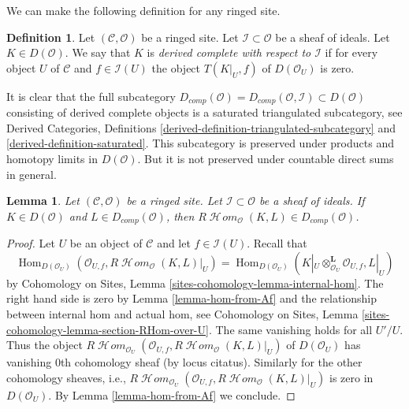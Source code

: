 \documentclass{stacks-project}
\theoremstyle{plain}
\newtheorem{lemma}[subsection]{Lemma}
\theoremstyle{definition}
\newtheorem{definition}[subsection]{Definition}
\theoremstyle{remark}
\numberwithin{equation}{subsection}
\def\Hom{\mathop{\mathrm{Hom}}\nolimits}
\def\SheafHom{\mathop{\mathcal{H}\!\mathit{om}}\nolimits}
\begin{document}
\noindent
We can make the following definition for any ringed site.

\begin{definition}
\label{definition-derived-complete}
Let $(\mathcal{C}, \mathcal{O})$ be a ringed site.
Let $\mathcal{I} \subset \mathcal{O}$ be a sheaf of ideals.
Let $K \in D(\mathcal{O})$. We say that $K$ is
{\it derived complete with respect to $\mathcal{I}$}
if for every object $U$ of $\mathcal{C}$ and $f \in \mathcal{I}(U)$
the object $T(K|_U, f)$ of $D(\mathcal{O}_U)$ is zero.
\end{definition}

\noindent
It is clear that the full subcategory
$D_{comp}(\mathcal{O}) = D_{comp}(\mathcal{O}, \mathcal{I}) \subset
D(\mathcal{O})$ consisting of derived complete objects
is a saturated triangulated subcategory, see
Derived Categories, Definitions
\ref{derived-definition-triangulated-subcategory} and
\ref{derived-definition-saturated}. This subcategory is preserved
under products and homotopy limits in $D(\mathcal{O})$.
But it is not preserved under countable direct sums in general.

\begin{lemma}
\label{lemma-derived-complete-internal-hom}
Let $(\mathcal{C}, \mathcal{O})$ be a ringed site.
Let $\mathcal{I} \subset \mathcal{O}$ be a sheaf of ideals.
If $K \in D(\mathcal{O})$ and $L \in D_{comp}(\mathcal{O})$, then
$R\SheafHom_\mathcal{O}(K, L) \in D_{comp}(\mathcal{O})$.
\end{lemma}

\begin{proof}
Let $U$ be an object of $\mathcal{C}$ and let $f \in \mathcal{I}(U)$.
Recall that
$$
\Hom_{D(\mathcal{O}_U)}(\mathcal{O}_{U, f}, R\SheafHom_\mathcal{O}(K, L)|_U)
=
\Hom_{D(\mathcal{O}_U)}(
K|_U \otimes_{\mathcal{O}_U}^\mathbf{L} \mathcal{O}_{U, f}, L|_U)
$$
by Cohomology on Sites, Lemma \ref{sites-cohomology-lemma-internal-hom}.
The right hand side is zero by Lemma \ref{lemma-hom-from-Af}
and the relationship between internal hom and actual hom, see
Cohomology on Sites, Lemma \ref{sites-cohomology-lemma-section-RHom-over-U}.
The same vanishing holds for all $U'/U$. Thus the object
$R\SheafHom_{\mathcal{O}_U}(\mathcal{O}_{U, f},
R\SheafHom_\mathcal{O}(K, L)|_U)$ of $D(\mathcal{O}_U)$ has vanishing
$0$th cohomology sheaf (by locus citatus). Similarly for the other
cohomology sheaves, i.e., $R\SheafHom_{\mathcal{O}_U}(\mathcal{O}_{U, f},
R\SheafHom_\mathcal{O}(K, L)|_U)$ is zero in $D(\mathcal{O}_U)$.
By Lemma \ref{lemma-hom-from-Af} we conclude.
\end{proof}
\end{document}
